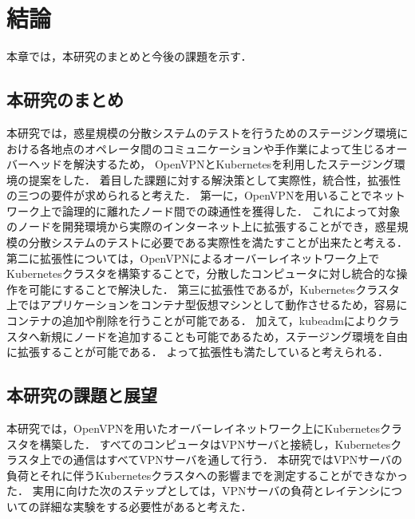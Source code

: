 \chapter{結論}
\label{conclusion}

本章では，本研究のまとめと今後の課題を示す．

\section{本研究のまとめ}
\label{conclusion:conclusion}

本研究では，惑星規模の分散システムのテストを行うためのステージング環境における各地点のオペレータ間のコミュニケーションや手作業によって生じるオーバーヘッドを解決するため，
OpenVPNとKubernetesを利用したステージング環境の提案をした．
着目した課題に対する解決策として実際性，統合性，拡張性の三つの要件が求められると考えた．
第一に，OpenVPNを用いることでネットワーク上で論理的に離れたノード間での疎通性を獲得した．
これによって対象のノードを開発環境から実際のインターネット上に拡張することができ，惑星規模の分散システムのテストに必要である実際性を満たすことが出来たと考える．
第二に拡張性については，OpenVPNによるオーバーレイネットワーク上でKubernetesクラスタを構築することで，分散したコンピュータに対し統合的な操作を可能にすることで解決した．
第三に拡張性であるが，Kubernetesクラスタ上ではアプリケーションをコンテナ型仮想マシンとして動作させるため，容易にコンテナの追加や削除を行うことが可能である．
加えて，kubeadmによりクラスタへ新規にノードを追加することも可能であるため，ステージング環境を自由に拡張することが可能である．
よって拡張性も満たしていると考えられる．

\section{本研究の課題と展望}
\label{conclusion:issue}

本研究では，OpenVPNを用いたオーバーレイネットワーク上にKubernetesクラスタを構築した．
すべてのコンピュータはVPNサーバと接続し，Kubernetesクラスタ上での通信はすべてVPNサーバを通して行う．
本研究ではVPNサーバの負荷とそれに伴うKubernetesクラスタへの影響までを測定することができなかった．
実用に向けた次のステップとしては，VPNサーバの負荷とレイテンシについての詳細な実験をする必要性があると考えた．

